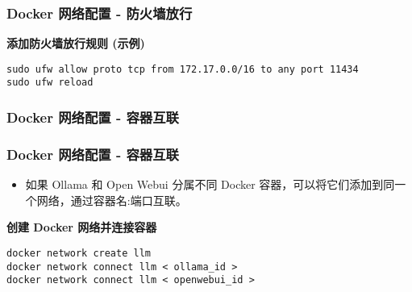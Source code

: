 \begin{frame}[fragile]
	\frametitle{Docker 网络配置 - 防火墙放行}
	\textbf{添加防火墙放行规则 (示例)}
	\begin{lstlisting}
sudo ufw allow proto tcp from 172.17.0.0/16 to any port 11434
sudo ufw reload
\end{lstlisting}
\end{frame}

\begin{frame}[fragile]
	\frametitle{Docker 网络配置 - 容器互联}
	\subsubsection{Docker 网络配置 - 容器互联}
	\begin{itemize}
		\item 如果 Ollama 和 Open Webui 分属不同 Docker 容器，可以将它们添加到同一个网络，通过容器名:端口互联。
	\end{itemize}
	\textbf{创建 Docker 网络并连接容器}
	\begin{lstlisting}
docker network create llm
docker network connect llm < ollama_id >
docker network connect llm < openwebui_id >
\end{lstlisting}
\end{frame}
